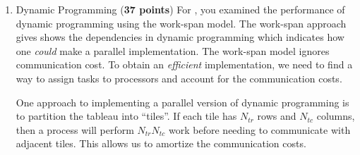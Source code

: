 \documentclass{article}
\begin{document}
\begin{enumerate}
    \item Dynamic Programming (\textbf{37 points})\label{q:dp}
          For ,
          you examined the performance of dynamic programming using the work-span model.
          The work-span approach gives shows the dependencies in dynamic programming which
          indicates how one \emph{could} make a parallel implementation.
          The work-span model ignores communication cost.
          To obtain an \emph{efficient} implementation, we need to find a way to assign
          tasks to processors and account for the communication costs.

          One approach to implementing a parallel version of dynamic programming
          is to partition the tableau into ``tiles''.
          If each tile has $N_{tr}$ rows and $N_{tc}$ columns,
          then a process will perform $N_{tr}N_{tc}$ work before needing
          to communicate with adjacent tiles.  This allows us to amortize the communication costs.


\end{enumerate}
\end{document}

